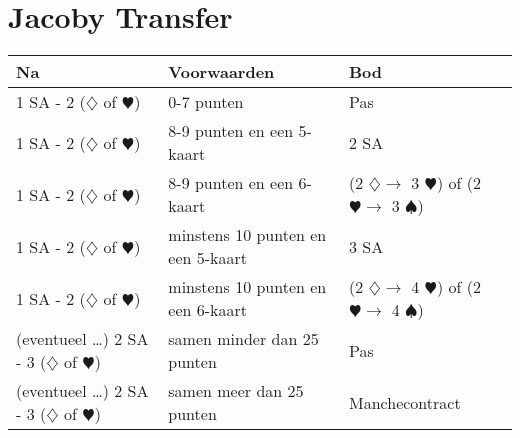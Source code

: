 \documentclass[12pt,a4paper]{report}
\begin{document}
\section{Jacoby Transfer}
\begin{tabular}{|l|p{}|p{3cm}|}
	\hline 
	\textbf{Na} &\textbf{Voorwaarden}  &\textbf{Bod}  \\  
	\hline
	
	1 SA - 2 ($\diamondsuit$ of $\varheartsuit$)
	& 0-7 punten
	& Pas \\
	\hline
	
	1 SA - 2 ($\diamondsuit$ of $\varheartsuit$)
	& 8-9  punten\newline
	  en een 5-kaart
	& 2 SA\\
	\hline	
	
	1 SA - 2 ($\diamondsuit$ of $\varheartsuit$)
	& 8-9  punten\newline
	  en een 6-kaart
	& (2 $\diamondsuit \rightarrow$ 3 $\varheartsuit$) of\newline
	  (2 $\varheartsuit \rightarrow$ 3 $\spadesuit$)\\
	\hline
	
	1 SA - 2 ($\diamondsuit$ of $\varheartsuit$)
	& minstens 10 punten\newline
	  en een 5-kaart
	& 3 SA\\
	\hline
	
	1 SA - 2 ($\diamondsuit$ of $\varheartsuit$)
	& minstens 10 punten\newline
	  en een 6-kaart
	& (2 $\diamondsuit \rightarrow$ 4 $\varheartsuit$) of\newline
	  (2 $\varheartsuit \rightarrow$ 4 $\spadesuit$)\\
	\hline
	\hline
	
	(eventueel \dots) 2 SA - 3 ($\diamondsuit$ of $\varheartsuit$)
	& samen minder dan 25 punten
	& Pas\\
	\hline
	
	(eventueel \dots) 2 SA - 3 ($\diamondsuit$ of $\varheartsuit$)
	& samen meer dan 25 punten
	& Manchecontract\\
	\hline
\end{tabular}

\newpage 
\end{document}
